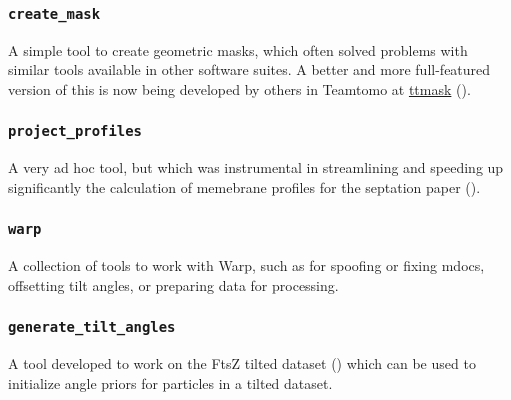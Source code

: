 \subsubsection{\texttt{create\_mask}}
A simple tool to create geometric masks, which often solved problems with similar tools available in other software suites.
A better and more full-featured version of this is now being developed by others in Teamtomo at \href{https://github.com/teamtomo/ttmask}{ttmask} ().

\subsubsection{\texttt{project\_profiles}}
A very ad hoc tool, but which was instrumental in streamlining and speeding up significantly the calculation of memebrane profiles for the septation paper ().

\subsubsection{\texttt{warp}}
A collection of tools to work with Warp, such as for spoofing or fixing mdocs, offsetting tilt angles, or preparing data for processing.

\subsubsection{\texttt{generate\_tilt\_angles}}\label{stemia_angles}
A tool developed to work on the FtsZ tilted dataset () which can be used to initialize angle priors for particles in a tilted dataset.
